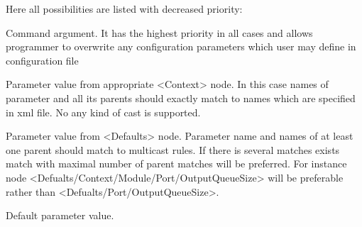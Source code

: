 Here all possibilities are listed with decreased priority:

\bbul
\item Command argument. It has the highest priority in all cases and allows programmer to
overwrite any configuration parameters which user may define in configuration file
\item Parameter value from appropriate <Context> node. In this case names of parameter and all its parents  
should exactly match to names which are specified in xml file. No any kind of cast is supported.  
\item Parameter value from <Defaults> node. Parameter name and names of at least one parent should match to multicast rules.
If there is several matches exists match with maximal number of parent matches will be preferred.
For instance node <Defualts/Context/Module/Port/OutputQueueSize> will be preferable rather than
<Defualts/Port/OutputQueueSize>. 
\item Default parameter value.
\ebul
    

